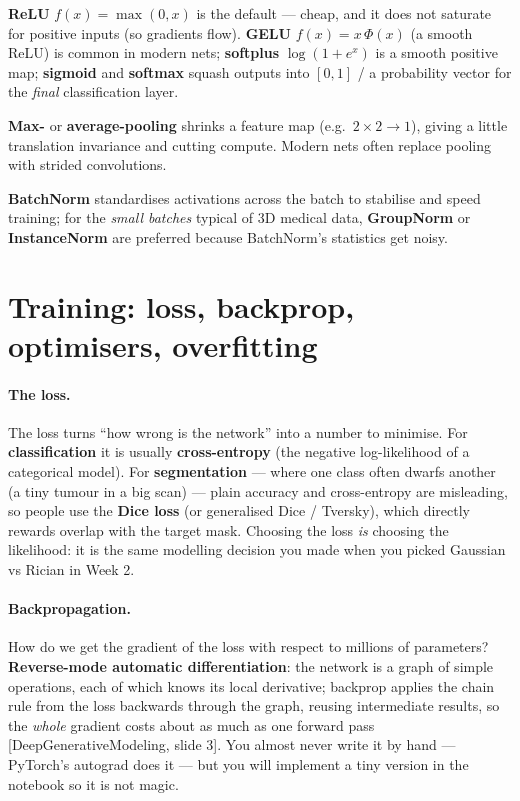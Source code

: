 \documentclass[11pt]{article}
\newcommand{\deck}[1]{\textsf{\small[#1]}}
\begin{document}
\begin{description}[leftmargin=*,nosep]
  \item[\textbf{Activations.}] \textbf{ReLU} $f(x)=\max(0,x)$ is the default ---
  cheap, and it does not saturate for positive inputs (so gradients flow).
  \textbf{GELU} $f(x)=x\,\Phi(x)$ (a smooth ReLU) is common in modern nets;
  \textbf{softplus} $\log(1+e^x)$ is a smooth positive map; \textbf{sigmoid} and
  \textbf{softmax} squash outputs into $[0,1]$ / a probability vector for the
  \emph{final} classification layer.
  \item[\textbf{Pooling.}] \textbf{Max-} or \textbf{average-pooling} shrinks a
  feature map (e.g.\ $2\times2\to1$), giving a little translation invariance and
  cutting compute. Modern nets often replace pooling with strided convolutions.
  \item[\textbf{Normalisation.}] \textbf{BatchNorm} standardises activations
  across the batch to stabilise and speed training; for the \emph{small batches}
  typical of 3D medical data, \textbf{GroupNorm} or \textbf{InstanceNorm} are
  preferred because BatchNorm's statistics get noisy.
\end{description}

\section{Training: loss, backprop, optimisers, overfitting}

\paragraph{The loss.} The loss turns ``how wrong is the network'' into a number
to minimise. For \textbf{classification} it is usually \textbf{cross-entropy}
(the negative log-likelihood of a categorical model). For \textbf{segmentation}
--- where one class often dwarfs another (a tiny tumour in a big scan) --- plain
accuracy and cross-entropy are misleading, so people use the \textbf{Dice loss}
(or generalised Dice / Tversky), which directly rewards overlap with the target
mask. Choosing the loss \emph{is} choosing the likelihood: it is the same modelling
decision you made when you picked Gaussian vs Rician in Week 2.

\paragraph{Backpropagation.} How do we get the gradient of the loss with respect
to millions of parameters? \textbf{Reverse-mode automatic differentiation}:
the network is a graph of simple operations, each of which knows its local
derivative; backprop applies the chain rule from the loss backwards through the
graph, reusing intermediate results, so the \emph{whole} gradient costs about as
much as one forward pass \deck{DeepGenerativeModeling, slide 3}. You almost never
write it by hand --- PyTorch's autograd does it --- but you will implement a tiny
version in the notebook so it is not magic.
\end{document}

